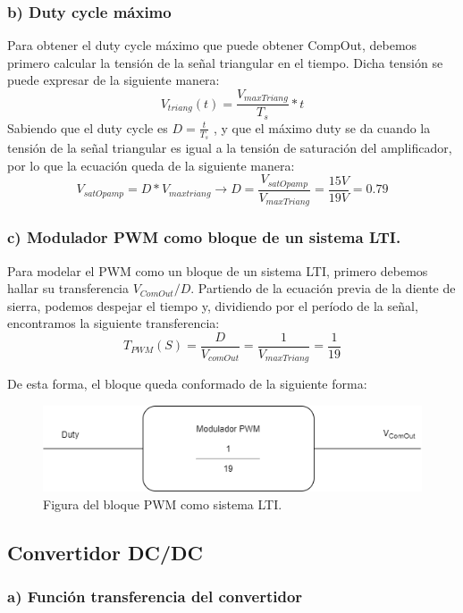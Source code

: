 \documentclass[e4_tp2_main.tex]{subfiles}
\begin{document}
\subsubsection*{b) Duty cycle m\'aximo}
Para obtener el duty cycle máximo que puede obtener CompOut, debemos primero calcular la tensión de la señal triangular en el tiempo. Dicha tensión se puede expresar de la siguiente manera:
\begin{equation}
V_{triang}(t)= \frac{V_{maxTriang}}{T_s} * t
\end{equation} 
Sabiendo que el duty cycle es $ D=\frac{t}{T_s}$  , y que el máximo duty se da cuando la tensión de la señal triangular es igual a la tensión de saturación del amplificador, por lo que la ecuación queda de la siguiente manera:
\begin{equation}
V_{satOpamp}= D*V_{maxtriang} \rightarrow D= \frac{V_{satOpamp}}{V_{maxTriang}}=\frac{15 V}{19V}=0.79
\end{equation}
\subsubsection*{c) Modulador PWM como bloque de un sistema LTI.}
Para modelar el PWM como un bloque de un sistema LTI, primero debemos hallar su transferencia $V_{ComOut}/D$. Partiendo de la ecuación previa de la diente de sierra, podemos despejar el tiempo y, dividiendo por el período de la señal, encontramos la siguiente transferencia:
\begin{equation}
T_{PWM}(S)=\frac{D}{V_{comOut}}=\frac{1}{V_{maxTriang}}=\frac{1}{19}
\end{equation} 

De esta forma, el bloque queda conformado de la siguiente forma:

\begin{figure}[H]
\centering
\includegraphics[width=0.5\linewidth]{Imagenes/Punto1/LTI.png}
\caption{Figura del bloque PWM como sistema LTI.}
\end{figure}


\subsection{Convertidor DC/DC}
\subsubsection*{a) Funci\'on transferencia del convertidor}
\end{document}
